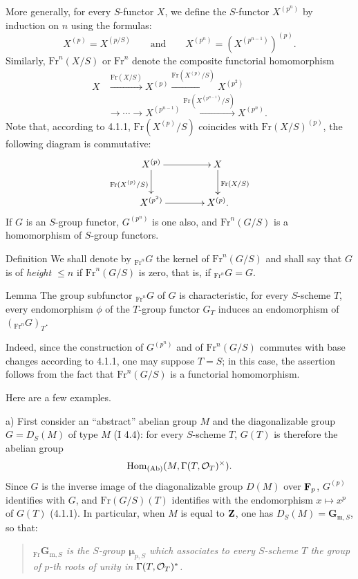 More generally, for every $S$-functor $X$, we define the $S$-functor $X^{(p^n)}$ by induction on $n$ using the formulas:
\[
X^{(p)}=X^{(p/S)}\qquad\text{and}\qquad X^{(p^n)}=(X^{(p^{n-1})})^{(p)}.
\]
Similarly, $\mathrm{Fr}^n(X/S)$ or $\mathrm{Fr}^n$ denote the composite functorial homomorphism
\[
\begin{aligned}
X&\xrightarrow{\mathrm{Fr}(X/S)}X^{(p)}\xrightarrow{\mathrm{Fr}(X^{(p)}/S)}X^{(p^2)}\\
&\longrightarrow\cdots\longrightarrow X^{(p^{n-1})}\xrightarrow{\mathrm{Fr}(X^{(p^{n-1})}/S)}X^{(p^n)}.
\end{aligned}
\]
Note that, according to 4.1.1, $\mathrm{Fr}(X^{(p)}/S)$ coincides with $\mathrm{Fr}(X/S)^{(p)}$, \ie the following diagram is commutative:
\[
\xymatrix@C=4em{X^{(p)}\ar[r]\ar[d]_{\mathrm{Fr}(X^{(p)}/S)}&X\ar[d]^{\mathrm{Fr}(X/S)}\\X^{(p^2)}\ar[r]&X^{(p)}.}
\]
If $G$ is an $S$-group functor, $G^{(p^n)}$ is one also, and $\mathrm{Fr}^n(G/S)$ is a homomorphism of $S$-group functors.

\begin{enoncerm}{Definition}{}
We shall denote by ${}_{\mathrm{Fr}^n}G$ the kernel of $\mathrm{Fr}^n(G/S)$ and shall say that $G$ is of \emph{height $\leq n$} if $\mathrm{Fr}^n(G/S)$ is zero, that is, if ${}_{\mathrm{Fr}^n}G=G$.
\end{enoncerm}
\begin{enonce}{Lemma}{}
The group subfunctor ${}_{\mathrm{Fr}^n}G$ of $G$ is characteristic, \ie for every $S$-scheme $T$, every endomorphism $\phi$ of the $T$-group functor $G_T$ induces an endomorphism of $({}_{\mathrm{Fr}^n}G)_T$.
\end{enonce}
Indeed, since the construction of $G^{(p^n)}$ and of $\mathrm{Fr}^n(G/S)$ commutes with base changes according to 4.1.1, one may suppose $T=S$; in this case, the assertion follows from the fact that $\mathrm{Fr}^n(G/S)$ is a functorial homomorphism.

Here are a few examples.

\noindent a) First consider an ``abstract'' abelian group $M$ and the diagonalizable group $G=D_S(M)$ of type $M$ (I 4.4): for every $S$-scheme $T$, $G(T)$ is therefore the abelian group
\[
\operatorname{Hom}_{\textup{(Ab)}}(M,\Gamma(T,\mathcal{O}_T)^\times).
\]
Since $G$ is the inverse image of the diagonalizable group $D(M)$ over $\mathbf{F}_p$, $G^{(p)}$ identifies with $G$, and $\mathrm{Fr}(G/S)(T)$ identifies with the endomorphism $x\mapsto x^p$ of $G(T)$ (4.1.1). In particular, when $M$ is equal to $\mathbf{Z}$, one has $D_S(M)=\mathbf G_{\mathrm m,S}$, so that:
\begin{quote}\emph{${}_{\mathrm{Fr}}\mathbf G_{\mathrm m,S}$ is the $S$-group $\boldsymbol\mu_{p,S}$ which associates to every $S$-scheme $T$ the group of $p$-th roots of unity in $\Gamma(T,\mathcal{O}_T)^*$.}\end{quote}

